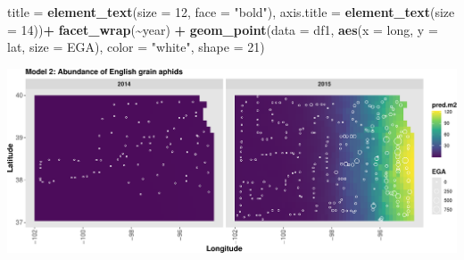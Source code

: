 \documentclass[
]{book}
\newenvironment{Shaded}{\begin{snugshade}}{\end{snugshade}}
\newcommand{\AttributeTok}[1]{\textcolor[rgb]{0.13,0.29,0.53}{#1}}
\newcommand{\DecValTok}[1]{\textcolor[rgb]{0.00,0.00,0.81}{#1}}
\newcommand{\FunctionTok}[1]{\textcolor[rgb]{0.13,0.29,0.53}{\textbf{#1}}}
\newcommand{\NormalTok}[1]{#1}
\newcommand{\SpecialCharTok}[1]{\textcolor[rgb]{0.81,0.36,0.00}{\textbf{#1}}}
\newcommand{\StringTok}[1]{\textcolor[rgb]{0.31,0.60,0.02}{#1}}
\begin{document}
\begin{Shaded}
\begin{Highlighting}[]
        \AttributeTok{title =} \FunctionTok{element\_text}\NormalTok{(}\AttributeTok{size =} \DecValTok{12}\NormalTok{, }\AttributeTok{face =} \StringTok{"bold"}\NormalTok{),}
        \AttributeTok{axis.title =} \FunctionTok{element\_text}\NormalTok{(}\AttributeTok{size =} \DecValTok{14}\NormalTok{))}\SpecialCharTok{+}
  \FunctionTok{facet\_wrap}\NormalTok{(}\SpecialCharTok{\textasciitilde{}}\NormalTok{year) }\SpecialCharTok{+}
  \FunctionTok{geom\_point}\NormalTok{(}\AttributeTok{data =}\NormalTok{ df1, }\FunctionTok{aes}\NormalTok{(}\AttributeTok{x =}\NormalTok{ long, }\AttributeTok{y =}\NormalTok{ lat, }\AttributeTok{size =}\NormalTok{ EGA), }\AttributeTok{color =} \StringTok{"white"}\NormalTok{, }\AttributeTok{shape =} \DecValTok{21}\NormalTok{) }
\end{Highlighting}
\end{Shaded}

\includegraphics{_main_files/figure-latex/unnamed-chunk-39-1.pdf}
\end{document}

